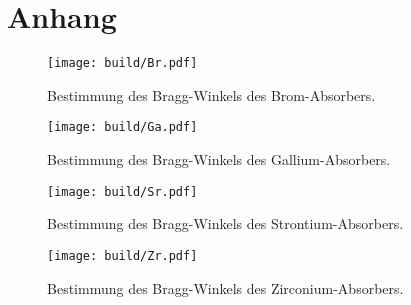 \section{Anhang}
\label{sec:Anhang}

\begin{figure}[H]
    \centering
    \texttt{[image: build/Br.pdf]}
    \caption{Bestimmung des Bragg-Winkels des Brom-Absorbers.}
    \label{fig:Br}
  \end{figure}

  \begin{figure}[H]
    \centering
    \texttt{[image: build/Ga.pdf]}
    \caption{Bestimmung des Bragg-Winkels des Gallium-Absorbers.}
    \label{fig:Ga}
  \end{figure}

  \begin{figure}[H]
    \centering
    \texttt{[image: build/Sr.pdf]}
    \caption{Bestimmung des Bragg-Winkels des Strontium-Absorbers.}
    \label{fig:Sr}
  \end{figure}

  \begin{figure}[H]
    \centering
    \texttt{[image: build/Zr.pdf]}
    \caption{Bestimmung des Bragg-Winkels des Zirconium-Absorbers.}
    \label{fig:Zr}
  \end{figure}